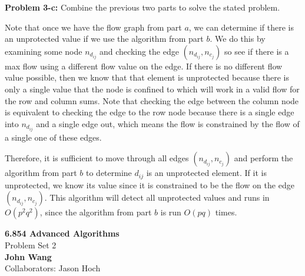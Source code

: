 \documentclass[psamsfonts]{amsart}
\newenvironment{sol}{\vspace{0.25cm}{\large \bfseries Solution:}}{\qedsymbol}
\newenvironment{prob}[1]{\begin{framed}{\large \bfseries Problem #1:}}{\end{framed}}
\newcommand{\makenewtitle}{
    \begin{center}
    {\huge \bfseries 6.854 Advanced Algorithms} \\
    Problem Set 2\\
    \vspace{0.25cm}
    {\bfseries John Wang} \\
    Collaborators: Jason Hoch
    \end{center}
    \vspace{0.5cm}
}
\begin{document}
\begin{prob}{3-c}
Combine the previous two parts to solve the stated problem.
\end{prob}
\begin{sol}
Note that once we have the flow graph from part $a$, we can determine if there is an unprotected value if we use the algorithm from part $b$. We do this by examining some node $n_{d_{ij}}$ and checking the edge $(n_{d_{ij}}, n_{c_j})$ so see if there is a max flow using a different flow value on the edge. If there is no different flow value possible, then we know that that element is unprotected because there is only a single value that the node is confined to which will work in a valid flow for the row and column sums. Note that checking the edge between the column node is equivalent to checking the edge to the row node because there is a single edge into $n_{d_{ij}}$ and a single edge out, which means the flow is constrained by the flow of a single one of these edges.

Therefore, it is sufficient to move through all edges $(n_{d_{ij}}, n_{c_j})$ and perform the algorithm from part $b$ to determine $d_{ij}$ is an unprotected element. If it is unprotected, we know its value since it is constrained to be the flow on the edge $(n_{d_{ij}}, n_{c_j})$. This algorithm will detect all unprotected values and runs in $O(p^2 q^2)$, since the algorithm from part $b$ is run $O(pq)$ times. 
\end{sol}

\newpage
\makenewtitle
\end{document}
